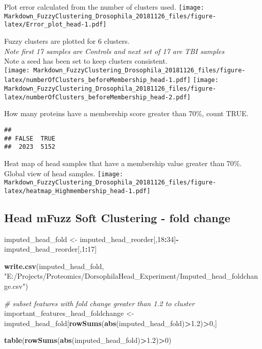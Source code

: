 \documentclass[]{article}
\newenvironment{Shaded}{\begin{snugshade}}{\end{snugshade}}
\newcommand{\KeywordTok}[1]{\textcolor[rgb]{0.13,0.29,0.53}{\textbf{#1}}}
\newcommand{\DecValTok}[1]{\textcolor[rgb]{0.00,0.00,0.81}{#1}}
\newcommand{\FloatTok}[1]{\textcolor[rgb]{0.00,0.00,0.81}{#1}}
\newcommand{\StringTok}[1]{\textcolor[rgb]{0.31,0.60,0.02}{#1}}
\newcommand{\CommentTok}[1]{\textcolor[rgb]{0.56,0.35,0.01}{\textit{#1}}}
\newcommand{\OperatorTok}[1]{\textcolor[rgb]{0.81,0.36,0.00}{\textbf{#1}}}
\newcommand{\NormalTok}[1]{#1}
\begin{document}
Plot error calculated from the number of clusters used.
\texttt{[image: Markdown\_FuzzyClustering\_Drosophila\_20181126\_files/figure-latex/Error\_plot\_head-1.pdf]}

Fuzzy clusters are plotted for 6 clusters.\\
\emph{Note first 17 samples are Controls and next set of 17 are TBI
samples\\
}Note a seed has been set to keep clusters consistent.\\
\texttt{[image: Markdown\_FuzzyClustering\_Drosophila\_20181126\_files/figure-latex/numberOfClusters\_beforeMembership\_head-1.pdf]}
\texttt{[image: Markdown\_FuzzyClustering\_Drosophila\_20181126\_files/figure-latex/numberOfClusters\_beforeMembership\_head-2.pdf]}

How many proteins have a membership score greater than 70\%, count TRUE.

\begin{verbatim}
## 
## FALSE  TRUE 
##  2023  5152
\end{verbatim}

Heat map of head samples that have a membership value greater than 70\%.
Global view of head samples.
\texttt{[image: Markdown\_FuzzyClustering\_Drosophila\_20181126\_files/figure-latex/heatmap\_Highmembership\_head-1.pdf]}

\subsection{Head mFuzz Soft Clustering - fold
change}\label{head-mfuzz-soft-clustering---fold-change}

\begin{Shaded}
\begin{Highlighting}[]
\NormalTok{imputed_head_fold <-}\StringTok{ }\NormalTok{imputed_head_reorder[,}\DecValTok{18}\OperatorTok{:}\DecValTok{34}\NormalTok{]}\OperatorTok{-}\NormalTok{imputed_head_reorder[,}\DecValTok{1}\OperatorTok{:}\DecValTok{17}\NormalTok{]}

\KeywordTok{write.csv}\NormalTok{(imputed_head_fold, }\StringTok{"E:/Projects/Proteomics/DorsophilaHead_Experiment/Imputed_head_foldchange.csv"}\NormalTok{)}

\CommentTok{# subset features with fold change greater than 1.2 to cluster}
\NormalTok{important_features_head_foldchange <-}\StringTok{ }\NormalTok{imputed_head_fold[}\KeywordTok{rowSums}\NormalTok{(}\KeywordTok{abs}\NormalTok{(imputed_head_fold)}\OperatorTok{>}\FloatTok{1.2}\NormalTok{)}\OperatorTok{>}\DecValTok{0}\NormalTok{,]}


\KeywordTok{table}\NormalTok{(}\KeywordTok{rowSums}\NormalTok{(}\KeywordTok{abs}\NormalTok{(imputed_head_fold)}\OperatorTok{>}\FloatTok{1.2}\NormalTok{)}\OperatorTok{>}\DecValTok{0}\NormalTok{)}
\end{Highlighting}
\end{Shaded}
\end{document}
